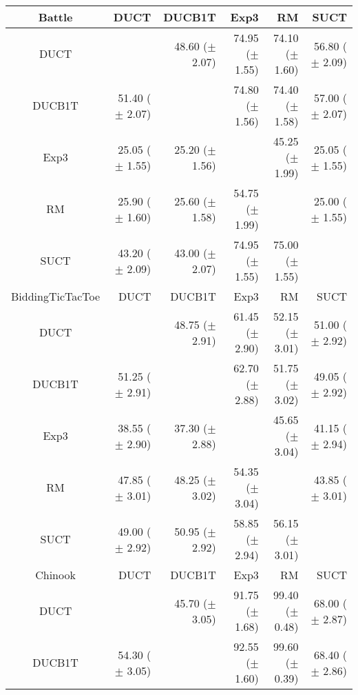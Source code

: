\documentclass{article}
\begin{document}
\begin{table}
\begin{center}
\begin{tabular}{|c|rrrrr|}
\hline
         Battle   &       DUCT   &     DUCB1T   &       Exp3   &         RM   &       SUCT   \\
\hline
           DUCT    &              & 48.60 ($\pm$ 2.07)   & 74.95 ($\pm$ 1.55)   & 74.10 ($\pm$ 1.60)   & 56.80 ($\pm$ 2.09)   \\
         DUCB1T    & 51.40 ($\pm$ 2.07)   &              & 74.80 ($\pm$ 1.56)   & 74.40 ($\pm$ 1.58)   & 57.00 ($\pm$ 2.07)   \\
           Exp3    & 25.05 ($\pm$ 1.55)   & 25.20 ($\pm$ 1.56)   &              & 45.25 ($\pm$ 1.99)   & 25.05 ($\pm$ 1.55)   \\
             RM    & 25.90 ($\pm$ 1.60)   & 25.60 ($\pm$ 1.58)   & 54.75 ($\pm$ 1.99)   &              & 25.00 ($\pm$ 1.55)   \\
           SUCT    & 43.20 ($\pm$ 2.09)   & 43.00 ($\pm$ 2.07)   & 74.95 ($\pm$ 1.55)   & 75.00 ($\pm$ 1.55)   &              \\
\hline
\hline
BiddingTicTacToe   &       DUCT   &     DUCB1T   &       Exp3   &         RM   &       SUCT   \\
\hline
           DUCT    &              & 48.75 ($\pm$ 2.91)   & 61.45 ($\pm$ 2.90)   & 52.15 ($\pm$ 3.01)   & 51.00 ($\pm$ 2.92)   \\
         DUCB1T    & 51.25 ($\pm$ 2.91)   &              & 62.70 ($\pm$ 2.88)   & 51.75 ($\pm$ 3.02)   & 49.05 ($\pm$ 2.92)   \\
           Exp3    & 38.55 ($\pm$ 2.90)   & 37.30 ($\pm$ 2.88)   &              & 45.65 ($\pm$ 3.04)   & 41.15 ($\pm$ 2.94)   \\
             RM    & 47.85 ($\pm$ 3.01)   & 48.25 ($\pm$ 3.02)   & 54.35 ($\pm$ 3.04)   &              & 43.85 ($\pm$ 3.01)   \\
           SUCT    & 49.00 ($\pm$ 2.92)   & 50.95 ($\pm$ 2.92)   & 58.85 ($\pm$ 2.94)   & 56.15 ($\pm$ 3.01)   &              \\
\hline
\hline
        Chinook   &       DUCT   &     DUCB1T   &       Exp3   &         RM   &       SUCT   \\
\hline
           DUCT    &              & 45.70 ($\pm$ 3.05)   & 91.75 ($\pm$ 1.68)   & 99.40 ($\pm$ 0.48)   & 68.00 ($\pm$ 2.87)   \\
         DUCB1T    & 54.30 ($\pm$ 3.05)   &              & 92.55 ($\pm$ 1.60)   & 99.60 ($\pm$ 0.39)   & 68.40 ($\pm$ 2.86)   \\

\end{tabular}
\end{center}
\end{table}
\end{document}
